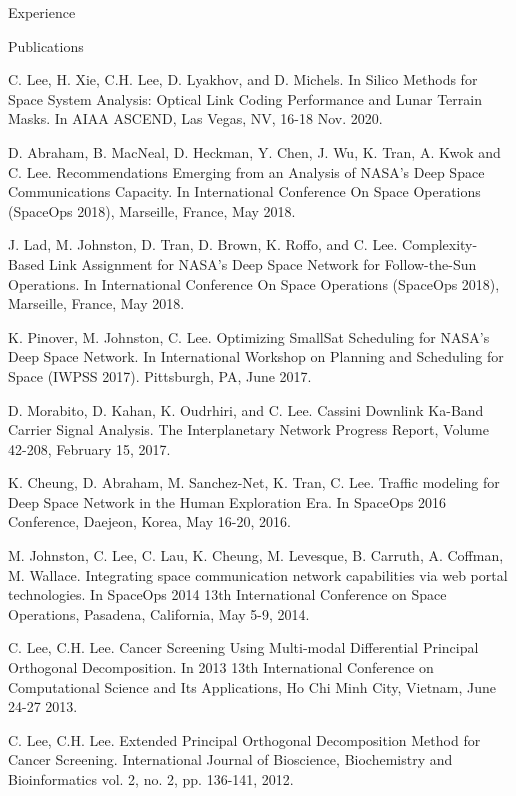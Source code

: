 \documentclass{resume} %
\begin{document}
\begin{rSection}{Experience}
\begin{rSection}{Publications}
\item C. Lee, H. Xie, C.H. Lee, D. Lyakhov, and D. Michels. In Silico Methods for Space System Analysis: Optical Link Coding Performance and Lunar Terrain Masks. In AIAA ASCEND, Las Vegas, NV, 16-18 Nov. 2020.

\item D. Abraham, B. MacNeal, D. Heckman, Y. Chen, J. Wu, K. Tran, A. Kwok and C. Lee. Recommendations Emerging from an Analysis of NASA’s Deep Space Communications Capacity. In International Conference On Space Operations (SpaceOps 2018), Marseille, France, May 2018. 


\item J. Lad, M. Johnston, D. Tran, D. Brown, K. Roffo, and C. Lee. Complexity-Based Link Assignment for NASA’s Deep Space Network for Follow-the-Sun Operations. In International Conference On Space Operations (SpaceOps 2018), Marseille, France, May 2018. 

\item K. Pinover, M. Johnston, C. Lee. Optimizing SmallSat Scheduling for NASA’s Deep Space Network. In International Workshop on Planning and Scheduling for Space (IWPSS 2017). Pittsburgh, PA, June 2017. 


\item D. Morabito, D. Kahan, K. Oudrhiri, and C. Lee. Cassini Downlink Ka-Band Carrier Signal Analysis. The Interplanetary Network Progress Report, Volume 42-208, February 15, 2017. 


\item K. Cheung, D. Abraham, M. Sanchez-Net, K. Tran, C. Lee. Traffic modeling for Deep Space Network in the Human Exploration Era. In SpaceOps 2016 Conference, Daejeon, Korea, May 16-20, 2016.


\item M. Johnston, C. Lee, C. Lau, K. Cheung, M. Levesque, B. Carruth, A. Coffman, M. Wallace. Integrating space communication network capabilities via web portal technologies. In SpaceOps 2014 13th International Conference on Space Operations, Pasadena, California, May 5-9, 2014. 


\item C. Lee, C.H. Lee. Cancer Screening Using Multi-modal Differential Principal Orthogonal Decomposition. In 2013 13th International Conference on Computational Science and Its Applications, Ho Chi Minh City, Vietnam, June 24-27 2013.

\item C. Lee, C.H. Lee. Extended Principal Orthogonal Decomposition Method for Cancer Screening. International Journal of Bioscience, Biochemistry and Bioinformatics vol. 2, no. 2, pp. 136-141, 2012.


\end{rSection}
\end{rSection}
\end{document}
